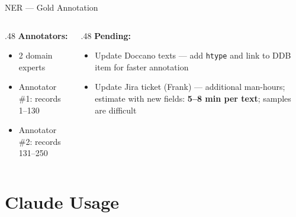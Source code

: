 \documentclass[xcolor,aspectratio=169,compress]{beamer}
\begin{document}
\begin{frame}{NER --- Gold Annotation}
  \small
  \begin{columns}[t]
    \begin{column}{.48\textwidth}
      \textbf{Annotators:}
      \begin{itemize}\setlength{\itemsep}{4pt}
        \item 2 domain experts
        \item Annotator \#1: records 1--130
        \item Annotator \#2: records 131--250
      \end{itemize}
    \end{column}
    \begin{column}{.48\textwidth}
      \textbf{Pending:}
      \begin{itemize}\setlength{\itemsep}{4pt}
        \item Update Doccano texts --- add \texttt{htype} and link to DDB item
              for faster annotation
        \item Update Jira ticket (Frank) --- additional man-hours;
              estimate with new fields: \textbf{5--8 min per text};
              samples are difficult
      \end{itemize}
    \end{column}
  \end{columns}
\end{frame}

\section{Claude Usage}
\end{document}
